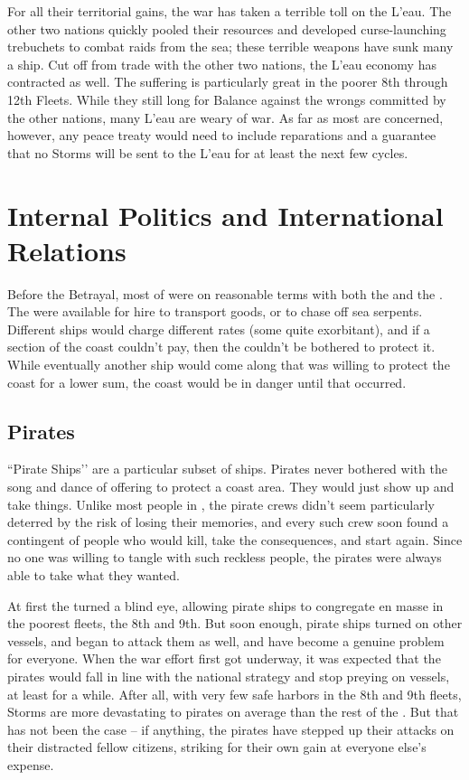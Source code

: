 \documentclass[blue]{GL2020}
\begin{document}
For all their territorial gains, the war has taken a terrible toll on the L'eau. The other two nations quickly pooled their resources and developed curse-launching trebuchets to combat raids from the sea; these terrible weapons have sunk many a ship. Cut off from trade with the other two nations, the L'eau economy has contracted as well. The suffering is particularly great in the poorer 8th through 12th Fleets. While they still long for Balance against the wrongs committed by the other nations, many L'eau are weary of war. As far as most are concerned, however, any peace treaty would need to include reparations and a guarantee that no Storms will be sent to the L'eau for at least the next few cycles.

\section*{Internal Politics and International Relations}
Before the Betrayal, most of \pShip{} were on reasonable terms with both the \pFarm{} and the \pTech{}. The \pShippies{} were available for hire to transport goods, or to chase off sea serpents. Different ships would charge different rates (some quite exorbitant), and if a section of the coast couldn't pay, then the \pShip{} couldn't be bothered to protect it. While eventually another ship would come along that was willing to protect the coast for a lower sum, the coast would be in danger until that occurred.

\subsection*{Pirates}
``Pirate Ships'’ are a particular subset of \pShip{} ships. Pirates never bothered with the song and dance of offering to protect a coast area. They would just show up and take things. Unlike most people in \pEarth{}, the pirate crews didn't seem particularly deterred by the risk of losing their memories, and every such crew soon found a contingent of people who would kill, take the consequences, and start again. Since no one was willing to tangle with such reckless people, the pirates were always able to take what they wanted. 

At first the \pShip{} turned a blind eye, allowing pirate ships to congregate en masse in the poorest fleets, the 8th and 9th. But soon enough, pirate ships turned on other \pShippie{} vessels, and began to attack them as well, and have become a genuine problem for everyone.
When the war effort first got underway, it was expected that the pirates would fall in line with the national strategy and stop preying on \pShippie{} vessels, at least for a while. After all, with very few safe harbors in the 8th and 9th fleets, Storms are more devastating to pirates on average than the rest of the \pShip{}. But that has not been the case -- if anything, the pirates have stepped up their attacks on their distracted fellow citizens, striking for their own gain at everyone else's expense.
\end{document}
